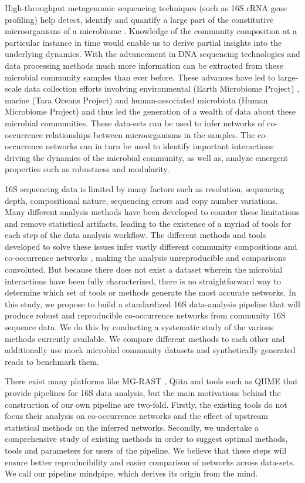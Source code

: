   High-throughput metagenomic sequencing techniques (such as 16S rRNA gene profiling) help detect, identify and quantify a large part of the constitutive microorganisms of a microbiome \cite{Jovel2016}.
  Knowledge of the community composition at a particular instance in time would enable us to derive partial insights into the underlying dynamics.
  With the advancement in DNA sequencing technologies \cite{Narihiro2017} and data processing methods much more information can be extracted from these microbial community samples than ever before.
  These advances have led to large-scale data collection efforts involving environmental (Earth Microbiome Project) \cite{Thompson2017}, marine (Tara Oceans Project) \cite{Zhang2015} and human-associated microbiota (Human Microbiome Project) \cite{HumanMicrobiomeProjectConsortium2012} and thus led the generation of a wealth of data about these microbial communities.
  These data-sets can be used to infer networks of co-occurrence relationships between microorganisms in the samples.
  The co-occurrence networks can in turn be used to identify important interactions driving the dynamics of the microbial community, as well as, analyze emergent properties such as robustness and modularity.


  16S sequencing data is limited by many factors such as resolution, sequencing depth, compositional nature, sequencing errors and copy number variations.
  Many different analysis methods have been developed \cite{Callahan2016,Amir2017,Friedman2012,Kurtz2015} to counter these limitations and remove statistical artifacts, leading to the existence of a myriad of tools for each step of the data analysis workflow.
  The different methods and tools developed to solve these issues infer vastly different community compositions and co-occurrence networks \cite{Golob2017,Weiss2016}, making the analysis unreproducible and comparisons convoluted.
  But because there does not exist a dataset wherein the microbial interactions have been fully characterized, there is no straightforward way to determine which set of tools or methods generate the most accurate networks.
  In this study, we propose to build a standardized 16S data-analysis pipeline that will produce robust and reproducible co-occurrence networks from community 16S sequence data.
  We do this by conducting a systematic study of the various methods currently available.
  We compare different methods to each other and additionally use mock microbial community datasets and synthetically generated reads to benchmark them.

  There exist many platforms like MG-RAST \cite{Keegan2016}, Qiita \cite{qiita} and tools such as QIIME \cite{Caporaso2010} that provide pipelines for 16S data analysis, but the main motivations behind the construction of our own pipeline are two-fold.
  Firstly, the existing tools do not focus their analysis on co-occurrence networks and the effect of upstream statistical methods on the inferred networks.
  Secondly, we undertake a comprehensive study of existing methods in order to suggest optimal methods, tools and parameters for users of the pipeline.
  We believe that these steps will ensure better reproducibility and easier comparison of networks across data-sets.
  We call our pipeline mindpipe, which derives its origin from the \ac{mind}.

